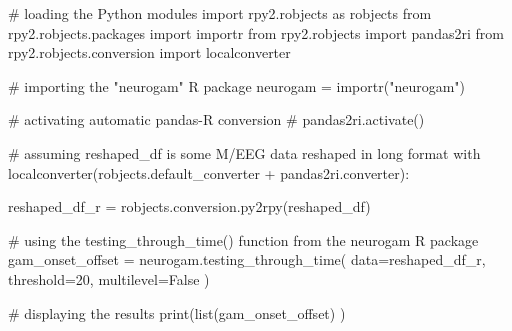 \documentclass[
  doc,
  floatsintext,
  longtable,
  a4paper,
  nolmodern,
  notxfonts,
  notimes,
  colorlinks=true,linkcolor=blue,citecolor=blue,urlcolor=blue]{apa7}
\newenvironment{Shaded}{\begin{snugshade}}{\end{snugshade}}
\newcommand{\BuiltInTok}[1]{\textcolor[rgb]{0.00,0.23,0.31}{#1}}
\newcommand{\CommentTok}[1]{\textcolor[rgb]{0.37,0.37,0.37}{#1}}
\newcommand{\ControlFlowTok}[1]{\textcolor[rgb]{0.00,0.23,0.31}{#1}}
\newcommand{\DecValTok}[1]{\textcolor[rgb]{0.68,0.00,0.00}{#1}}
\newcommand{\ImportTok}[1]{\textcolor[rgb]{0.00,0.46,0.62}{#1}}
\newcommand{\NormalTok}[1]{\textcolor[rgb]{0.00,0.23,0.31}{#1}}
\newcommand{\OperatorTok}[1]{\textcolor[rgb]{0.37,0.37,0.37}{#1}}
\newcommand{\StringTok}[1]{\textcolor[rgb]{0.13,0.47,0.30}{#1}}
\newcommand{\VariableTok}[1]{\textcolor[rgb]{0.07,0.07,0.07}{#1}}
\begin{document}
\begin{Shaded}
\begin{Highlighting}[]
\CommentTok{\# loading the Python modules}
\ImportTok{import}\NormalTok{ rpy2.robjects }\ImportTok{as}\NormalTok{ robjects}
\ImportTok{from}\NormalTok{ rpy2.robjects.packages }\ImportTok{import}\NormalTok{ importr}
\ImportTok{from}\NormalTok{ rpy2.robjects }\ImportTok{import}\NormalTok{ pandas2ri}
\ImportTok{from}\NormalTok{ rpy2.robjects.conversion }\ImportTok{import}\NormalTok{ localconverter}

\CommentTok{\# importing the "neurogam" R package}
\NormalTok{neurogam }\OperatorTok{=}\NormalTok{ importr(}\StringTok{"neurogam"}\NormalTok{)}

\CommentTok{\# activating automatic pandas{-}R conversion}
\CommentTok{\# pandas2ri.activate()}

\CommentTok{\# assuming reshaped\_df is some M/EEG data reshaped in long format}
\ControlFlowTok{with}\NormalTok{ localconverter(robjects.default\_converter }\OperatorTok{+}\NormalTok{ pandas2ri.converter):}
    
\NormalTok{    reshaped\_df\_r }\OperatorTok{=}\NormalTok{ robjects.conversion.py2rpy(reshaped\_df)}
    

\CommentTok{\# using the testing\_through\_time() function from the neurogam R package}
\NormalTok{gam\_onset\_offset }\OperatorTok{=}\NormalTok{ neurogam.testing\_through\_time(}
\NormalTok{    data}\OperatorTok{=}\NormalTok{reshaped\_df\_r,}
\NormalTok{    threshold}\OperatorTok{=}\DecValTok{20}\NormalTok{,}
\NormalTok{    multilevel}\OperatorTok{=}\VariableTok{False}
\NormalTok{    )}

\CommentTok{\# displaying the results}
\BuiltInTok{print}\NormalTok{(}\BuiltInTok{list}\NormalTok{(gam\_onset\_offset) )}
\end{Highlighting}
\end{Shaded}
\end{document}
